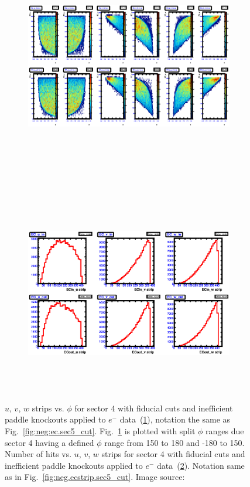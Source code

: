 \begin{figure}[htpb]
  \centering
  \begin{subfigure}[b]{\figwidth}
  \includegraphics[width=\figwidth, height=3.5in,valign=c]{figures/calib/ec/pim_ecuvw_phi_afterGeoFid_sec4.eps}\caption{}\label{fig:EC_III_IV}
  \end{subfigure}%
  \\
  \begin{subfigure}[b]{\figwidth}
  \includegraphics[width=\figwidth, height=3.5in,valign=c]{figures/calib/ec/pim_ecuvw_afterGeoFid_sec4.eps}\caption{}\label{fig:EC_IV_IV}
  \end{subfigure}%
      \caption { $u$, $v$, $w$ strips vs. $\phi$ for sector 4 with fiducial cuts and inefficient paddle knockouts applied to $e^-$ data~(\ref{fig:EC_III_IV}), notation the same as Fig.~\ref{fig:neg:ec.sec5_cut}. Fig.~\ref{fig:EC_III_IV} is plotted with split $\phi$ ranges due sector 4 having a defined $\phi$ range from 150 to 180 and -180 to 150. Number of hits vs.  $u$, $v$, $w$ strips for sector 4 with fiducial cuts and inefficient paddle knockouts applied to $e^-$ data~(\ref{fig:EC_IV_IV}). Notation same as in Fig.~\ref{fig:neg.ecstrip.sec5_cut}. Image source:~\cite{clas.thesis.kunkel}}
        \label{fig:EC_cut_IV}
\end{figure}


